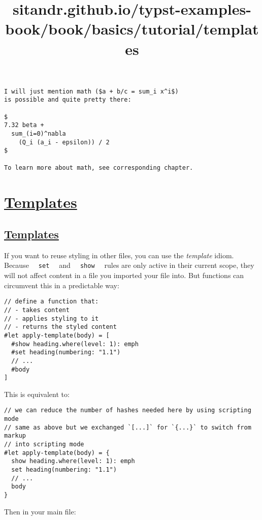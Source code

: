 \begin{verbatim}
I will just mention math ($a + b/c = sum_i x^i$)
is possible and quite pretty there:

$
7.32 beta +
  sum_(i=0)^nabla
    (Q_i (a_i - epsilon)) / 2
$

To learn more about math, see corresponding chapter.
\end{verbatim}

\pandocbounded{}


\title{sitandr.github.io/typst-examples-book/book/basics/tutorial/templates}

\section{\texorpdfstring{\hyperref[templates]{Templates}}{Templates}}\label{templates}

\subsection{\texorpdfstring{\hyperref[templates-1]{Templates}}{Templates}}\label{templates-1}

If you want to reuse styling in other files, you can use the
\emph{template} idiom. Because \texttt{\ }{\texttt{\ set\ }}\texttt{\ }
and \texttt{\ }{\texttt{\ show\ }}\texttt{\ } rules are only active in
their current scope, they will not affect content in a file you imported
your file into. But functions can circumvent this in a predictable way:

\begin{verbatim}
// define a function that:
// - takes content
// - applies styling to it
// - returns the styled content
#let apply-template(body) = [
  #show heading.where(level: 1): emph
  #set heading(numbering: "1.1")
  // ...
  #body
]
\end{verbatim}

This is equivalent to:

\begin{verbatim}
// we can reduce the number of hashes needed here by using scripting mode
// same as above but we exchanged `[...]` for `{...}` to switch from markup
// into scripting mode
#let apply-template(body) = {
  show heading.where(level: 1): emph
  set heading(numbering: "1.1")
  // ...
  body
}
\end{verbatim}

Then in your main file:

